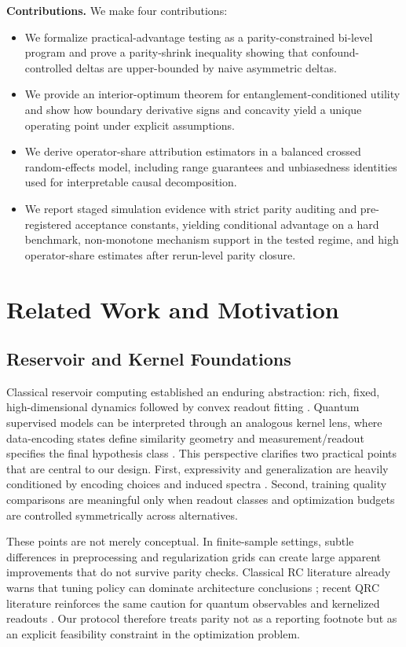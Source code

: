 \documentclass{article} %
\begin{document}
\noindent\textbf{Contributions.} We make four contributions:
\begin{itemize}
\item We formalize practical-advantage testing as a parity-constrained bi-level program and prove a parity-shrink inequality showing that confound-controlled deltas are upper-bounded by naive asymmetric deltas.
\item We provide an interior-optimum theorem for entanglement-conditioned utility and show how boundary derivative signs and concavity yield a unique operating point under explicit assumptions.
\item We derive operator-share attribution estimators in a balanced crossed random-effects model, including range guarantees and unbiasedness identities used for interpretable causal decomposition.
\item We report staged simulation evidence with strict parity auditing and pre-registered acceptance constants, yielding conditional advantage on a hard benchmark, non-monotone mechanism support in the tested regime, and high operator-share estimates after rerun-level parity closure.
\end{itemize}

\section{Related Work and Motivation}
\subsection{Reservoir and Kernel Foundations}
Classical reservoir computing established an enduring abstraction: rich, fixed, high-dimensional dynamics followed by convex readout fitting \citep{jaeger2001,maass2002,lukosevicius2009}. Quantum supervised models can be interpreted through an analogous kernel lens, where data-encoding states define similarity geometry and measurement/readout specifies the final hypothesis class \citep{havlicek2019,schuld2021kernel}. This perspective clarifies two practical points that are central to our design. First, expressivity and generalization are heavily conditioned by encoding choices and induced spectra \citep{schuld2020encoding}. Second, training quality comparisons are meaningful only when readout classes and optimization budgets are controlled symmetrically across alternatives.

These points are not merely conceptual. In finite-sample settings, subtle differences in preprocessing and regularization grids can create large apparent improvements that do not survive parity checks. Classical RC literature already warns that tuning policy can dominate architecture conclusions \citep{lukosevicius2009}; recent QRC literature reinforces the same caution for quantum observables and kernelized readouts \citep{gross2026kernelop,aaraba2026quark}. Our protocol therefore treats parity not as a reporting footnote but as an explicit feasibility constraint in the optimization problem.
\end{document}
